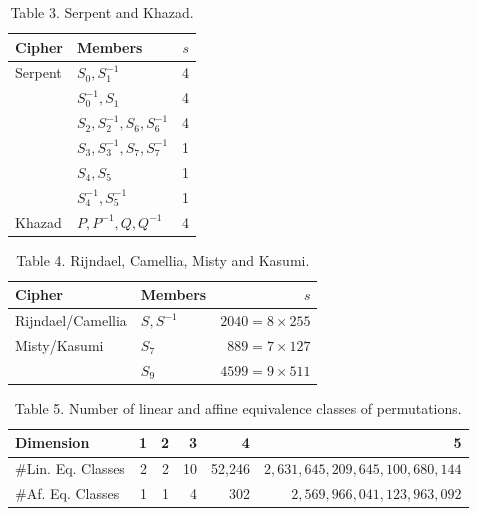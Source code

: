 \documentclass[10pt]{article}
\begin{document}
\begin{table}[h]
\begin{center}
\captionsetup{labelformat=empty}
\caption{Table 3. Serpent and Khazad.}
\begin{tabular}{llr}
\hline
Cipher & Members & $s$ \\
\hline
Serpent & $S_{0}, S_{1}^{-1}$ & 4 \\
 & $S_{0}^{-1}, S_{1}$ & 4 \\
 & $S_{2}, S_{2}^{-1}, S_{6}, S_{6}^{-1}$ & 4 \\
 & $S_{3}, S_{3}^{-1}, S_{7}, S_{7}^{-1}$ & 1 \\
 & $S_{4}, S_{5}$ & 1 \\
 & $S_{4}^{-1}, S_{5}^{-1}$ & 1 \\
\hline
Khazad & $P, P^{-1}, Q, Q^{-1}$ & 4 \\
\hline
\end{tabular}
\end{center}
\end{table}

\begin{table}[h]
\begin{center}
\captionsetup{labelformat=empty}
\caption{Table 4. Rijndael, Camellia, Misty and Kasumi.}
\begin{tabular}{llr}
\hline
Cipher & Members & $s$ \\
\hline
Rijndael/Camellia & $S, S^{-1}$ & $2040=8 \times 255$ \\
\hline
Misty/Kasumi & $S_{7}$ & $889=7 \times 127$ \\
 & $S_{9}$ & $4599=9 \times 511$ \\
\hline
\end{tabular}
\end{center}
\end{table}

\begin{table}[h]
\begin{center}
\captionsetup{labelformat=empty}
\caption{Table 5. Number of linear and affine equivalence classes of permutations.}
\begin{tabular}{lrrrrr}
\hline
Dimension & 1 & 2 & 3 & 4 & 5 \\
\hline
\#Lin. Eq. Classes & 2 & 2 & 10 & 52,246 & $2,631,645,209,645,100,680,144$ \\
\#Af. Eq. Classes & 1 & 1 & 4 & 302 & $2,569,966,041,123,963,092$ \\
\hline
\end{tabular}
\end{center}
\end{table}
\end{document}

